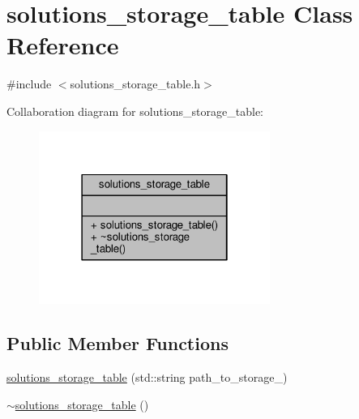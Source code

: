 \hypertarget{classsolutions__storage__table}{\section{solutions\-\_\-storage\-\_\-table Class Reference}
\label{classsolutions__storage__table}
}


{\ttfamily \#include $<$solutions\-\_\-storage\-\_\-table.\-h$>$}



Collaboration diagram for solutions\-\_\-storage\-\_\-table\-:
\nopagebreak
\begin{figure}[H]
\begin{center}
\leavevmode
\includegraphics[width=214pt]{classsolutions__storage__table__coll__graph}
\end{center}
\end{figure}
\subsection*{Public Member Functions}
\begin{DoxyCompactItemize}
\item 
\hyperlink{classsolutions__storage__table_a82c00fa1e846e5ca2cfaffa3c7c9de3c}{solutions\-\_\-storage\-\_\-table} (std\-::string path\-\_\-to\-\_\-storage\-\_\-)
\item 
\hyperlink{classsolutions__storage__table_a46cb135ed1e0f2d825463bb92846704c}{$\sim$solutions\-\_\-storage\-\_\-table} ()
\end{DoxyCompactItemize}


